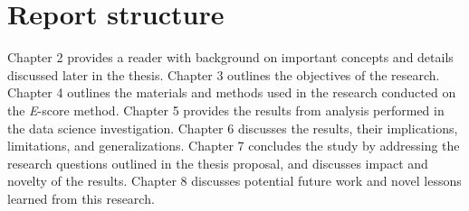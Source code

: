 \section{Report structure}
Chapter 2 provides a reader with background on important concepts and details discussed later in the thesis. Chapter 3 outlines the objectives of the research. Chapter 4 outlines the materials and methods used in the research conducted on the \textit{E}-score method. Chapter 5 provides the results from analysis performed in the data science investigation. Chapter 6 discusses the results, their implications, limitations, and generalizations. Chapter 7 concludes the study by addressing the research questions outlined in the thesis proposal, and discusses impact and novelty of the results. Chapter 8 discusses potential future work and novel lessons learned from this research.